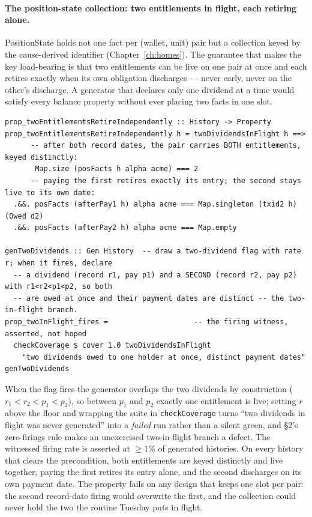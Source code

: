 \paragraph{The position-state collection: two entitlements in flight, each retiring alone.}
PositionState holds not one fact per (wallet, unit) pair but a collection keyed by the
cause-derived identifier (Chapter~\ref{ch:homes}). The guarantee that makes the key
load-bearing is that two entitlements can be live on one pair at once and each retires exactly
when its own obligation discharges --- never early, never on the other's discharge. A generator
that declares only one dividend at a time would satisfy every balance property without ever
placing two facts in one slot.

\begin{lstlisting}
prop_twoEntitlementsRetireIndependently :: History -> Property
prop_twoEntitlementsRetireIndependently h = twoDividendsInFlight h ==>
      -- after both record dates, the pair carries BOTH entitlements, keyed distinctly:
       Map.size (posFacts h alpha acme) === 2
      -- paying the first retires exactly its entry; the second stays live to its own date:
  .&&. posFacts (afterPay1 h) alpha acme === Map.singleton (txid2 h) (Owed d2)
  .&&. posFacts (afterPay2 h) alpha acme === Map.empty

genTwoDividends :: Gen History  -- draw a two-dividend flag with rate r; when it fires, declare
  -- a dividend (record r1, pay p1) and a SECOND (record r2, pay p2) with r1<r2<p1<p2, so both
  -- are owed at once and their payment dates are distinct -- the two-in-flight branch.
prop_twoInFlight_fires =                    -- the firing witness, asserted, not hoped
  checkCoverage $ cover 1.0 twoDividendsInFlight
    "two dividends owed to one holder at once, distinct payment dates" genTwoDividends
\end{lstlisting}

When the flag fires the generator overlaps the two dividends by construction ($r_1<r_2<p_1<p_2$),
so between $p_1$ and $p_2$ exactly one entitlement is live; setting $r$ above the floor and
wrapping the suite in \texttt{checkCoverage} turns ``two dividends in flight was never
generated'' into a \emph{failed} run rather than a silent green, and \S 2's zero-firings rule
makes an unexercised two-in-flight branch a defect. The witnessed firing rate is asserted at
$\ge 1\%$ of generated histories. On every history that clears the precondition, both
entitlements are keyed distinctly and live together, paying the first retires its entry alone,
and the second discharges on its own payment date. The property fails on any design that keeps
one slot per pair: the second record-date firing would overwrite the first, and the collection
could never hold the two the routine Tuesday puts in flight.

